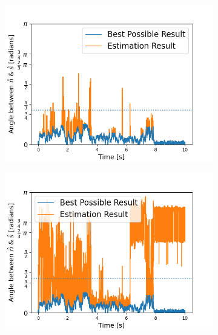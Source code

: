 \documentclass[final,  3p]{elsarticle}
\begin{document}
\begin{figure}[h]
	\centering
	\begin{subfigure}{0.32\textwidth}
		\subcaption{}
		\includegraphics[width=\textwidth]{./Images/fig6a.png}
	\end{subfigure}
	\begin{subfigure}{0.32\textwidth}
		\subcaption{}
		\includegraphics[width=\textwidth]{./Images/fig6b.png}
	\end{subfigure}
	\begin{subfigure}{0.32\textwidth}
		\subcaption{}

\end{subfigure}
\end{figure}
\end{document}

